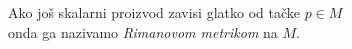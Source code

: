 \documentclass[preview]{standalone}
\begin{document}
\begin{center}
Ako još skalarni proizvod zavisi glatko od tačke \(p \in M\)\\
        onda ga nazivamo \emph{Rimanovom metrikom} na \(M\).
\end{center}
\end{document}
